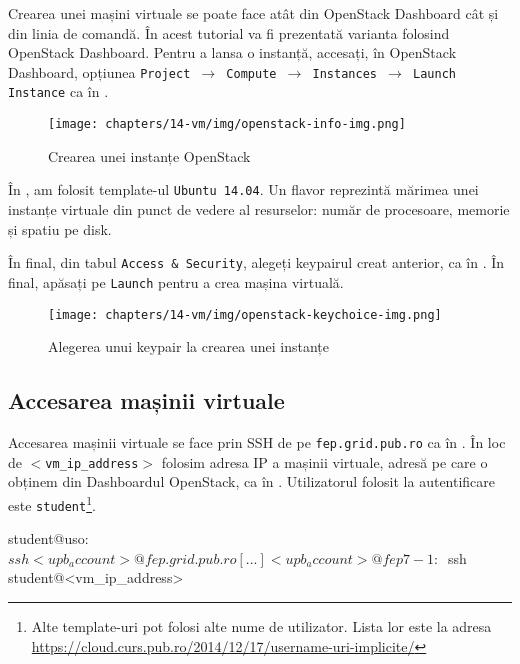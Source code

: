 Crearea unei mașini virtuale se poate face atât din OpenStack Dashboard cât și
din linia de comandă. În acest tutorial va fi prezentată varianta folosind
OpenStack Dashboard. Pentru a lansa o instanță, accesați, în OpenStack Dashboard, opțiunea
\texttt{Project $\rightarrow$ Compute $\rightarrow$ Instances $\rightarrow$ Launch Instance} ca în .

\begin{figure}[!htbp]
  \centering
  \texttt{[image: chapters/14-vm/img/openstack-info-img.png]}
  \caption{Crearea unei instanțe OpenStack}
  \label{fig:vm:openstack-info-img}
\end{figure}

În , am folosit template-ul \texttt{Ubuntu 14.04}. Un flavor reprezintă
mărimea unei instanțe virtuale din punct de vedere al resurselor: număr de
procesoare, memorie și spatiu pe disk.

În final, din tabul \texttt{Access \& Security}, alegeți keypairul creat anterior, ca în . În final, apăsați pe \texttt{Launch} pentru a crea mașina virtuală.

\begin{figure}[!htbp]
  \centering
  \texttt{[image: chapters/14-vm/img/openstack-keychoice-img.png]}
  \caption{Alegerea unui keypair la crearea unei instanțe}
  \label{fig:vm:openstack-keychoice}
\end{figure}

\subsection{Accesarea mașinii virtuale}
\label{sec:vm:upb-openstack:vm-access}

Accesarea mașinii virtuale se face prin SSH de pe \texttt{fep.grid.pub.ro} ca în .
În loc de \texttt{$<$vm\_ip\_address$>$} folosim adresa IP a mașinii virtuale, adresă pe care o obținem din Dashboardul OpenStack, ca în .  Utilizatorul folosit la autentificare este \texttt{student}\footnote{Alte template-uri pot folosi alte nume de utilizator. Lista lor este la adresa \url{https://cloud.curs.pub.ro/2014/12/17/username-uri-implicite/}}.

\begin{screen}[caption={Accesarea mașinii virtuale prin intermediul fep.grid.pub.ro},label={lst:vm:access-vm}]
student@uso:~$ ssh <upb_account>@fep.grid.pub.ro
[...]
<upb_account>@fep7-1:~$ ssh student@<vm_ip_address>
\end{screen}

